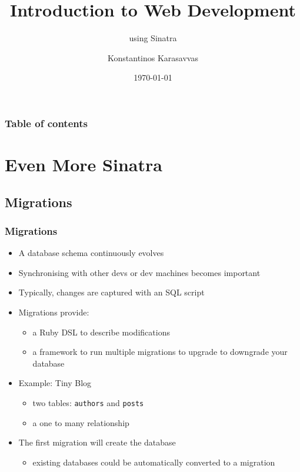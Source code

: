 \documentclass{beamer}
\begin{document}
\title{Introduction to Web Development}
\subtitle{using Sinatra}
\author[Konstantinos Karasavvas]{Konstantinos Karasavvas} %

\date{\today} 

\begin{frame}
  \titlepage
\end{frame}

\begin{frame}
\setcounter{tocdepth}{2}
\frametitle{Table of contents}
\tableofcontents
\end{frame} 





\section{Even More Sinatra}

\subsection{Migrations} 
\begin{frame}\frametitle{Migrations} 

  \begin{itemize}
    \item A database schema continuously evolves
    \item Synchronising with other devs or dev machines becomes important
    \item Typically, changes are captured with an SQL script
    \item Migrations provide:
    \begin{itemize}
      \item a Ruby DSL to describe modifications
      \item a framework to run multiple migrations to upgrade to downgrade your database
    \end{itemize}
    
    \item Example: Tiny Blog
    \begin{itemize}
      \item two tables: \texttt{authors} and \texttt{posts}
      \item a one to many relationship
    \end{itemize}
    
    \item The first migration will create the database
    \begin{itemize}
      \item existing databases could be automatically converted to a migration
    \end{itemize}
    
  \end{itemize}

\end{frame}
\end{document}
